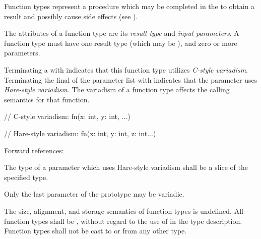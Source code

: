 \specsubsubitem
Function types represent a procedure which may be completed in the
 to obtain a result and possibly cause side
effects (see ).

\specsubsubitem
The attributes of a function type are its \textit{result type} and
\textit{input parameters}. A function type must have one result type (which may
be ), and zero or more parameters.

\specsubsubitem
Terminating a  with  indicates that
this function type utilizes \textit{C-style variadism}. Terminating the final
 of the parameter list with  indicates
that the parameter uses \textit{Hare-style variadism}. The variadism of a
function type affects the calling semantics for that function.

\begin{codesample}
// C-style variadism:
fn(x: int, y: int, ...)

// Hare-style variadism:
fn(x: int, y: int, z: int...)
\end{codesample}

Forward references: 

\specsubsubitem
The type of a parameter which uses Hare-style variadism shall be a
 slice of the specified type.


\specsubsubitem
Only the last parameter of the prototype may be variadic.

\specsubsubitem
The size, alignment, and storage semantics of function types is undefined. All
function types shall be , without regard to the use of
 in the type description. Function types shall not be cast to
or from any other type.


\begin{grammar}
 \\
	 \\
\end{grammar}
